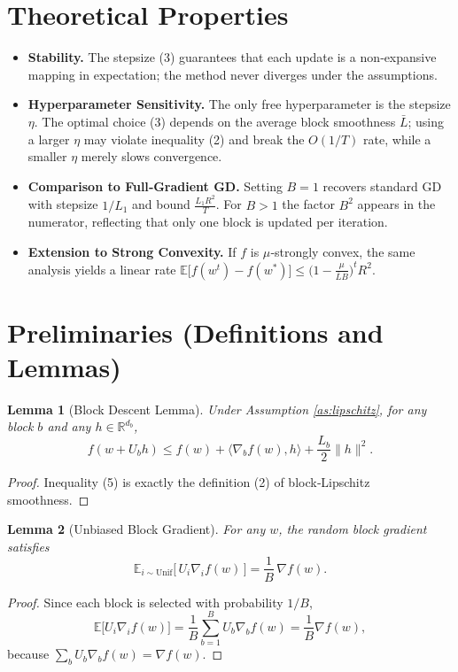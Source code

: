 \documentclass{article}
\newtheorem{lemma}{Lemma}
\newcommand{\E}{\mathbb{E}}
\begin{document}
\section*{Theoretical Properties}
\begin{itemize}
\item \textbf{Stability.} The stepsize (3) guarantees that each update is a
non‑expansive mapping in expectation; the method never diverges under the
assumptions.
\item \textbf{Hyperparameter Sensitivity.} The only free hyperparameter is the
stepsize $\eta$. The optimal choice (3) depends on the average block smoothness
$\bar L$; using a larger $\eta$ may violate inequality (2) and break the $O(1/T)$
rate, while a smaller $\eta$ merely slows convergence.
\item \textbf{Comparison to Full‑Gradient GD.} Setting $B=1$ recovers standard GD
with stepsize $1/L_{1}$ and bound $\frac{L_{1}R^{2}}{T}$. For $B>1$ the factor
$B^{2}$ appears in the numerator, reflecting that only one block is updated per
iteration.
\item \textbf{Extension to Strong Convexity.} If $f$ is $\mu$‑strongly convex,
the same analysis yields a linear rate
$\E\!\bigl[f(w^{t})-f(w^{*})\bigr]\le \bigl(1-\frac{\mu}{\bar L B}\bigr)^{t}R^{2}$.
\end{itemize}

\section*{Preliminaries (Definitions and Lemmas)}
\begin{lemma}[Block Descent Lemma]\label{lem:descent}
Under Assumption \ref{as:lipschitz}, for any block $b$ and any $h\in\mathbb{R}^{d_{b}}$,
\[
f(w+U_{b}h)\le f(w)+\langle\nabla_{b}f(w),h\rangle+\frac{L_{b}}{2}\|h\|^{2}.
\tag{5}
\]
\end{lemma}
\begin{proof}
Inequality (5) is exactly the definition (2) of block‑Lipschitz smoothness. \qedhere
\end{proof}

\begin{lemma}[Unbiased Block Gradient]\label{lem:unbiased}
For any $w$, the random block gradient satisfies
\[
\E_{i\sim\text{Unif}}\!\bigl[\,U_{i}\nabla_{i}f(w)\,\bigr]
=\frac{1}{B}\,\nabla f(w).
\tag{6}
\]
\end{lemma}
\begin{proof}
Since each block is selected with probability $1/B$,
\[
\E\!\bigl[U_{i}\nabla_{i}f(w)\bigr]
=\frac{1}{B}\sum_{b=1}^{B}U_{b}\nabla_{b}f(w)
=\frac{1}{B}\nabla f(w),
\]
because $\sum_{b}U_{b}\nabla_{b}f(w)=\nabla f(w)$. \qedhere
\end{proof}
\end{document}
